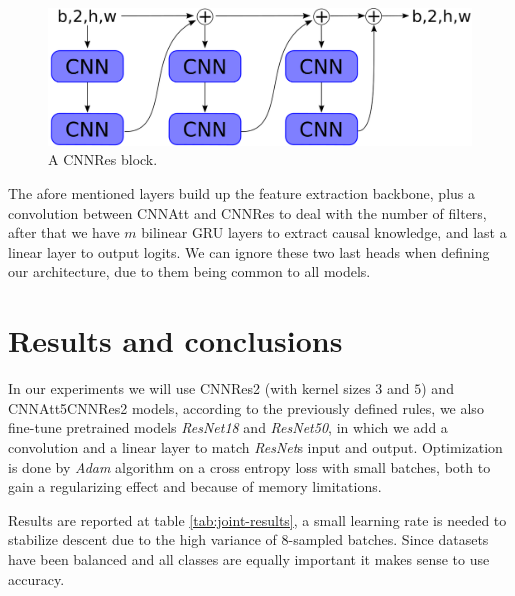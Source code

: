 \documentclass{article}
\begin{document}
\begin{figure}
    \centering
    \includegraphics[scale=.25]{images/cnn_res.png}
    \caption{A CNNRes block.}
    \label{fig:cnnres}
\end{figure}

The afore mentioned layers build up the feature extraction backbone, plus a convolution between CNNAtt and CNNRes to deal with the number of filters, after that we have $m$ bilinear GRU layers to extract causal knowledge, and last a linear layer to output logits.
We can ignore these two last heads when defining our architecture, due to them being common to all models.

\section{Results and conclusions}
In our experiments we will use CNNRes2 (with kernel sizes $3$ and $5$) and CNNAtt5CNNRes2 models, according to the previously defined rules, we also fine-tune pretrained models \textit{ResNet18} and \textit{ResNet50}, in which we add a convolution and a linear layer to match \textit{ResNet}s input and output.
Optimization is done by \textit{Adam} algorithm on a cross entropy loss with small batches, both to gain a regularizing effect and because of memory limitations.

Results are reported at table \ref{tab:joint-results}, a small learning rate is needed to stabilize descent due to the high variance of 8-sampled batches.
Since datasets have been balanced and all classes are equally important it makes sense to use accuracy.
\end{document}
